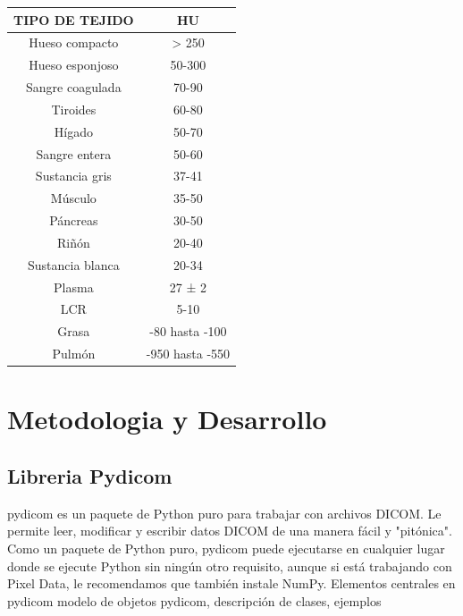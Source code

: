 \documentclass{article}
\begin{document}
\begin{table}[H]
\begin{center}
\begin{tabular}{| c | c |}
\hline
TIPO DE TEJIDO & HU \\ \hline
Hueso compacto & > 250 \\
Hueso esponjoso & 50-300 \\
Sangre coagulada & 70-90 \\
Tiroides & 60-80\\
Hígado & 50-70\\
Sangre entera & 50-60\\
Sustancia gris & 37-41\\
Músculo & 35-50\\
Páncreas & 30-50\\
Riñón & 20-40\\
Sustancia blanca & 20-34\\
Plasma & 27 ± 2\\
LCR & 5-10\\
Grasa & -80 hasta -100\\
Pulmón & -950 hasta -550\\ \hline
\end{tabular}
\end{center}
\end{table}


\section{Metodologia y Desarrollo}

\subsection{Libreria Pydicom}
pydicom es un paquete de Python puro para trabajar con archivos DICOM. Le permite leer, modificar y escribir datos DICOM de una manera fácil y "pitónica".
Como un paquete de Python puro, pydicom puede ejecutarse en cualquier lugar donde se ejecute Python sin ningún otro requisito, aunque si está trabajando con Pixel Data, le recomendamos que también instale NumPy.
Elementos centrales en pydicom
modelo de objetos pydicom, descripción de clases, ejemplos
\end{document}
